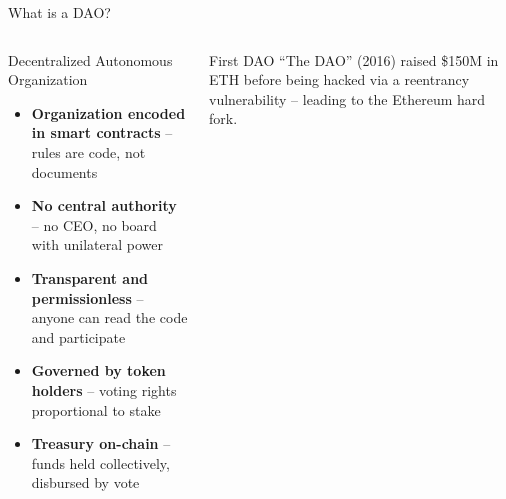 \documentclass[8pt,aspectratio=169]{beamer}
\begin{document}
\begin{frame}{What is a DAO?}
\begin{columns}[T]
\begin{block}{Decentralized Autonomous Organization}
\footnotesize
\begin{itemize}
  \item \textbf{Organization encoded in smart contracts} -- rules are code, not documents
  \item \textbf{No central authority} -- no CEO, no board with unilateral power
  \item \textbf{Transparent and permissionless} -- anyone can read the code and participate
  \item \textbf{Governed by token holders} -- voting rights proportional to stake
  \item \textbf{Treasury on-chain} -- funds held collectively, disbursed by vote
\end{itemize}
\end{block}
\vspace{2mm}
\begin{exampleblock}{First DAO}
\footnotesize
``The DAO'' (2016) raised \$150M in ETH before being hacked via a reentrancy vulnerability -- leading to the Ethereum hard fork.
\end{exampleblock}


\end{columns}
\end{frame}
\end{document}
